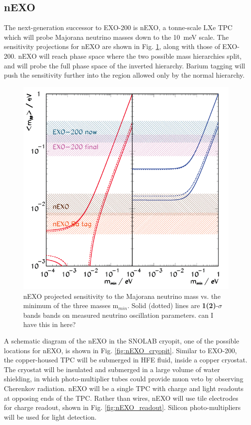 \subsection{nEXO}

The next-generation successor to EXO-200 is nEXO, a tonne-scale LXe TPC which will probe Majorana neutrino masses down to the 10~meV scale.  The sensitivity projections for nEXO are shown in Fig. \ref{fig:sensitivity_nEXO}, along with those of EXO-200.  nEXO will reach phase space where the two possible mass hierarchies split, and will probe the full phase space of the inverted hierarchy.  Barium tagging will push the sensitivity further into the region allowed only by the normal hierarchy.


\begin{figure} %
	\centering
	\includegraphics[width=.9\textwidth]{figures/sensitivity_v2.png}
	\caption{nEXO projected sensitivity to the Majorana neutrino mass vs. the minimum of the three masses m$_{min}$.  Solid (dotted) lines are \textbf{\color{red}1(2)}-$\sigma$ bands bands on measured neutrino oscillation parameters.  {\color{red}can I have this in here?}}
\label{fig:sensitivity_nEXO}
\end{figure}

A schematic diagram of the nEXO in the SNOLAB cryopit, one of the possible locations for nEXO, is shown in Fig. \ref{fig:nEXO_cryopit}.  Similar to EXO-200, the copper-housed TPC will be submerged in HFE fluid, inside a copper cryostat.  The cryostat will be insulated and submerged in a large volume of water shielding, in which photo-multiplier tubes could provide muon veto by observing Cherenkov radiation.  nEXO will be a single TPC with charge and light readouts at opposing ends of the TPC.  Rather than wires, nEXO will use tile electrodes for charge readout, shown in Fig. \ref{fig:nEXO_readout}.  Silicon photo-multipliers will be used for light detection.


